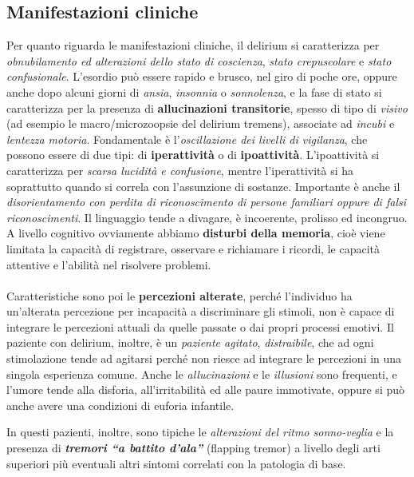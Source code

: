 \subsection{Manifestazioni cliniche}

Per quanto riguarda le manifestazioni cliniche, il delirium si
caratterizza per \emph{obnubilamento ed alterazioni dello stato di
coscienza}, \emph{stato crepuscolare} e \emph{stato confusionale}.
L'esordio può essere rapido e brusco, nel giro di poche ore, oppure
anche dopo alcuni giorni di \emph{ansia}, \emph{insonnia} o
\emph{sonnolenza}, e la fase di stato si caratterizza per la presenza di
\textbf{allucinazioni transitorie}, spesso di tipo di \emph{visivo} (ad
esempio le macro/microzoopsie del delirium tremens), associate ad
\emph{incubi} e \emph{lentezza motoria}. Fondamentale è
l'\emph{oscillazione dei livelli di vigilanza}, che possono essere di
due tipi: di \textbf{iperattività} o di \textbf{ipoattività}.
L'ipoattività si caratterizza per \emph{scarsa lucidità e confusione},
mentre l'iperattività si ha soprattutto quando si correla con
l'assunzione di sostanze. Importante è anche il \emph{disorientamento
con perdita di riconoscimento di persone familiari oppure di falsi
riconoscimenti}. Il linguaggio tende a divagare, è incoerente, prolisso
ed incongruo. A livello cognitivo ovviamente abbiamo \textbf{disturbi
della memoria}, cioè viene limitata la capacità di registrare, osservare
e richiamare i ricordi, le capacità attentive e l'abilità nel risolvere
problemi.
\\\\
Caratteristiche sono poi le \textbf{percezioni alterate}, perché
l'individuo ha un'alterata percezione per incapacità a discriminare gli
stimoli, non è capace di integrare le percezioni attuali da quelle
passate o dai propri processi emotivi. Il paziente con delirium,
inoltre, è un \emph{paziente agitato}, \emph{distraibile}, che ad ogni
stimolazione tende ad agitarsi perché non riesce ad integrare le
percezioni in una singola esperienza comune. Anche le
\emph{allucinazioni} e le \emph{illusioni} sono frequenti, e l'umore
tende alla disforia, all'irritabilità ed alle paure immotivate, oppure
si può anche avere una condizioni di euforia infantile.

In questi pazienti, inoltre, sono tipiche le \emph{alterazioni del ritmo
sonno-veglia} e la presenza di \textbf{\emph{tremori ``a battito
d'ala''}} (flapping tremor) a livello degli arti superiori più eventuali
altri sintomi correlati con la patologia di base.

